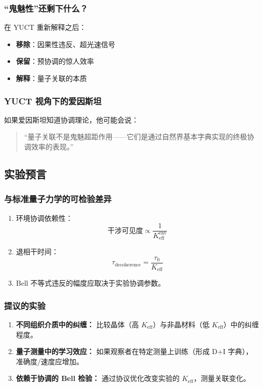 \documentclass[11pt,a4paper]{article}
\begin{document}
	\subsubsection{“鬼魅性”还剩下什么？}
	在 YUCT 重新解释之后：
	\begin{itemize}
		\item \textbf{移除}：因果性违反、超光速信号
		\item \textbf{保留}：预协调的惊人效率
		\item \textbf{解释}：量子关联的本质
	\end{itemize}
	
	\subsubsection{YUCT 视角下的爱因斯坦}
	如果爱因斯坦知道协调理论，他可能会说：
	
	\begin{quote}
		“量子关联不是鬼魅超距作用——它们是通过自然界基本字典实现的终极协调效率的表现。”
	\end{quote}
	
	\subsection{实验预言}
	\label{subsec:epr-experimental}
	
	\subsubsection{与标准量子力学的可检验差异}
	\begin{enumerate}
		\item 环境协调依赖性：
		\begin{equation}
			\text{干涉可见度} \propto \frac{1}{K_{\mathrm{eff}}^{\text{env}}}
		\end{equation}
		
		\item 退相干时间：
		\begin{equation}
			\tau_{\text{decoherence}} = \frac{\tau_0}{K_{\mathrm{eff}}}
		\end{equation}
		
		\item Bell 不等式违反的幅度应取决于实验协调参数。
	\end{enumerate}
	
	\subsubsection{提议的实验}
	\begin{enumerate}
		\item \textbf{不同组织介质中的纠缠：} 比较晶体（高 $K_{\mathrm{eff}}$）与非晶材料（低 $K_{\mathrm{eff}}$）中的纠缠程度。
		
		\item \textbf{量子测量中的学习效应：} 如果观察者在特定测量上训练（形成 D+I 字典），准确度/速度应增加。
		
		\item \textbf{依赖于协调的 Bell 检验：} 通过协议优化改变实验的 $K_{\mathrm{eff}}$，测量关联变化。
	\end{enumerate}
	
\end{document}
